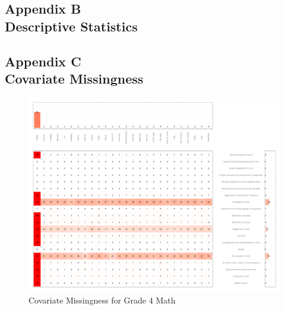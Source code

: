 \newpage
{}
\subsection*{Appendix B\\Descriptive Statistics}
\label{appendixDescriptives}

\begin{singlespace}

 \clearpage
 \clearpage

 \clearpage
 \clearpage

 \clearpage
 \clearpage

 \clearpage
 \clearpage

\end{singlespace}

\clearpage
{}
\subsection*{Appendix C\\Covariate Missingness}
\label{appendixmissing}

\begin{figure}[h]
\begin{center}
\includegraphics[width=\textwidth]{../Figures2009/g4math-missing.pdf}
\caption{Covariate Missingness for Grade 4 Math}
\label{fig:g4math:missing}
\end{center}
\end{figure}

